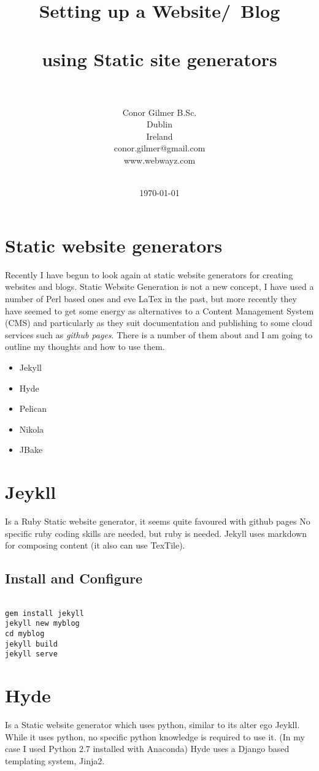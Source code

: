 \documentclass[12pt]{article}			%
\title{Setting up a Website/\ Blog\\~\\ using Static site generators\\~\\}	%
\author{	Conor Gilmer B.Sc.\\	%
		Dublin \\
		Ireland \\
		conor.gilmer@gmail.com\\
		www.webwayz.com\\~\\
		}
\date{\today}				%
\begin{document}
\maketitle
\newpage
\tableofcontents
\newpage

\section{Static website generators}
Recently I have begun to look again at static website generators for creating websites and blogs. Static Website Generation is not a new concept, I have used a number of Perl based ones and eve LaTex in the past, but more recently they have seemed to get some energy as alternatives to a Content Management System (CMS) and particularly as they suit documentation and publishing to some cloud services such as \textit{github pages}. There is a number of them about and I am going to outline my thoughts and how to use them.
\begin{itemize}
\item Jekyll
\item Hyde
\item Pelican
\item Nikola
\item JBake
\end{itemize}


\newpage
\section{Jeykll}
Is a Ruby Static website generator, it seems quite favoured with github pages
No specific ruby coding skills are needed, but ruby is needed.
Jekyll uses markdown for composing content (it also can use TexTile).
\subsection{Install and Configure}

\begin{verbatim}

gem install jekyll
jekyll new myblog
cd myblog
jekyll build
jekyll serve

\end{verbatim}



\newpage
\section{Hyde}
Is a Static website generator which uses python, similar to its alter ego Jeykll.
While it uses python, no specific python knowledge is required to use it. (In my case I used Python 2.7 installed with Anaconda) Hyde uses a Django based templating system, Jinja2. 
\end{document}
